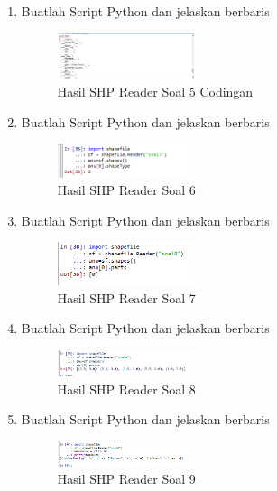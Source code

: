 \begin{enumerate}
    \item Buatlah Script Python dan jelaskan berbaris
    
    \hfill\break
    \begin{figure}[H]
		\includegraphics[width=4cm]{figures/1174015/3/No5.png}
		\centering
		\caption{Hasil SHP Reader Soal 5 Codingan}
    \end{figure}
    
    \item Buatlah Script Python dan jelaskan berbaris
    
    \hfill\break
    \begin{figure}[H]
		\includegraphics[width=4cm]{figures/1174015/3/No6.png}
		\centering
		\caption{Hasil SHP Reader Soal 6}
    \end{figure}

    \item Buatlah Script Python dan jelaskan berbaris
    
    \hfill\break
    \begin{figure}[H]
		\includegraphics[width=4cm]{figures/1174015/3/No7.png}
		\centering
		\caption{Hasil SHP Reader Soal 7}
    \end{figure}

    \item Buatlah Script Python dan jelaskan berbaris
    
    \hfill\break
    \begin{figure}[H]
		\includegraphics[width=4cm]{figures/1174015/3/No8.png}
		\centering
		\caption{Hasil SHP Reader Soal 8}
    \end{figure}

    \item Buatlah Script Python dan jelaskan berbaris
    
    \hfill\break
    \begin{figure}[H]
		\includegraphics[width=4cm]{figures/1174015/3/No9.png}
		\centering
		\caption{Hasil SHP Reader Soal 9}
    \end{figure}


\end{enumerate}
